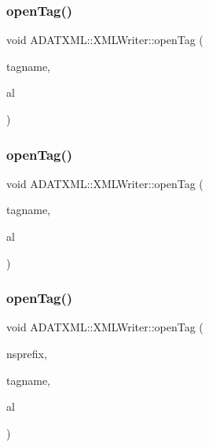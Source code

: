 \mbox{\label{classADATXML_1_1XMLWriter_a0d90742225631452502c6716ee737fef}} 
\subsubsection{\texorpdfstring{openTag()}{openTag()}\hspace{0.1cm}{\footnotesize\ttfamily [8/12]}}
{\footnotesize\ttfamily void A\+D\+A\+T\+X\+M\+L\+::\+X\+M\+L\+Writer\+::open\+Tag (\begin{DoxyParamCaption}\item[{const std\+::string \&}]{tagname,  }\item[{\mbox{\hyperlink{namespaceXMLWriterAPI_a28cf3d8051a4ccf0aef208b7ebc66d07}{X\+M\+L\+Writer\+A\+P\+I\+::\+Attribute\+List}} \&}]{al }\end{DoxyParamCaption})}

\mbox{\label{classADATXML_1_1XMLWriter_a0d90742225631452502c6716ee737fef}} 
\subsubsection{\texorpdfstring{openTag()}{openTag()}\hspace{0.1cm}{\footnotesize\ttfamily [9/12]}}
{\footnotesize\ttfamily void A\+D\+A\+T\+X\+M\+L\+::\+X\+M\+L\+Writer\+::open\+Tag (\begin{DoxyParamCaption}\item[{const std\+::string \&}]{tagname,  }\item[{\mbox{\hyperlink{namespaceXMLWriterAPI_a28cf3d8051a4ccf0aef208b7ebc66d07}{X\+M\+L\+Writer\+A\+P\+I\+::\+Attribute\+List}} \&}]{al }\end{DoxyParamCaption})}

\mbox{\label{classADATXML_1_1XMLWriter_a26795936be9ebee12c374fa82065ffb5}} 
\subsubsection{\texorpdfstring{openTag()}{openTag()}\hspace{0.1cm}{\footnotesize\ttfamily [10/12]}}
{\footnotesize\ttfamily void A\+D\+A\+T\+X\+M\+L\+::\+X\+M\+L\+Writer\+::open\+Tag (\begin{DoxyParamCaption}\item[{const std\+::string \&}]{nsprefix,  }\item[{const std\+::string \&}]{tagname,  }\item[{\mbox{\hyperlink{namespaceXMLWriterAPI_a28cf3d8051a4ccf0aef208b7ebc66d07}{X\+M\+L\+Writer\+A\+P\+I\+::\+Attribute\+List}} \&}]{al }\end{DoxyParamCaption})}


